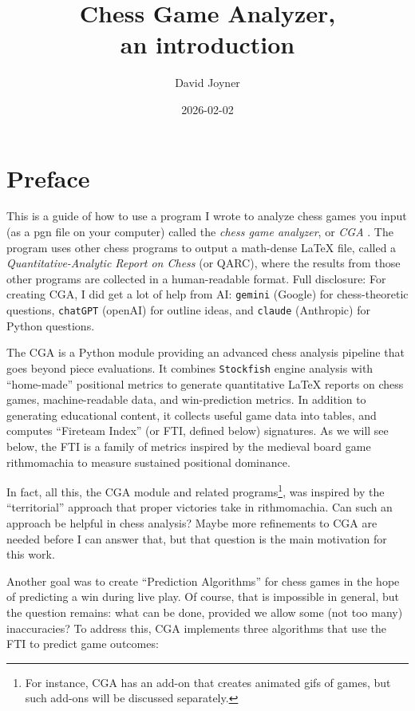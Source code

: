 \documentclass[12pt]{book}
\title{Chess Game Analyzer,\\
an introduction}
\author{David Joyner}
\date{2026-02-02}
\begin{document}
\maketitle

\tableofcontents

\newpage


\chapter*{Preface}

This is a guide of how to use a program I wrote to
analyze chess games you input (as a pgn file on your computer)
called the {\it chess game analyzer}, or {\it CGA} \cite{CGA26}.
The program uses other chess programs to output a
math-dense LaTeX file, called a
{\it Quantitative-Analytic Report on Chess} (or QARC),
where the results from those other programs are collected
in a human-readable format. Full disclosure: For creating CGA,
I did get a lot of help from AI: {\tt gemini} (Google) for
chess-theoretic questions, {\tt chatGPT} (openAI) for outline ideas,
and {\tt claude} (Anthropic) for Python questions.

The CGA is a Python module providing
an advanced chess analysis pipeline that goes beyond piece
evaluations. It combines {\tt Stockfish} engine analysis with
``home-made'' positional metrics to generate quantitative
LaTeX reports on chess games, machine-readable data, and
win-prediction metrics.
In addition to generating educational content, it collects
useful game data into tables, and computes
``Fireteam Index'' (or FTI, defined below) signatures.
As we will see below, the FTI is a family of metrics inspired by
the medieval board game rithmomachia \cite{Ri25} to measure
sustained positional dominance.

In fact, all this, the CGA module and related
programs\footnote{For instance, CGA has an add-on that creates
animated gifs of games, but such add-ons will be discussed separately.},
was inspired by the ``territorial'' approach that proper
victories take in rithmomachia. Can such an approach be helpful in
chess analysis? Maybe more refinements to CGA are needed before I can answer
that, but that question is the main motivation for this work.

Another goal was to create ``Prediction Algorithms'' for chess games
in the hope of predicting a win during live play.
Of course, that is impossible in general, but the question remains:
what can be done,
provided we allow some (not too many) inaccuracies?
To address this, CGA implements three algorithms that use the FTI to
predict game outcomes:
\end{document}
